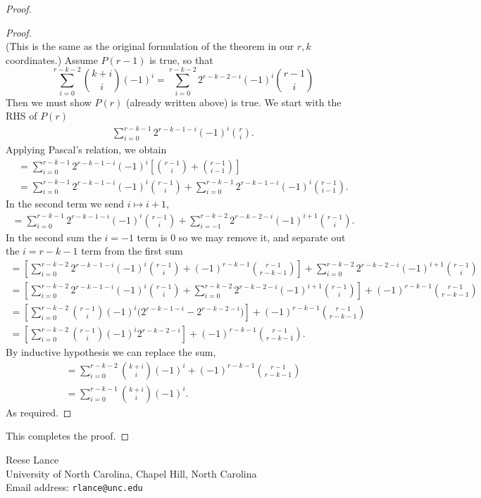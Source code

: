 \documentclass[11pt]{article}
\theoremstyle{plain}
\theoremstyle{definition}
\theoremstyle{definition}
\begin{document}
\begin{proof}
\begin{proof}
$$$$
(This is the same as the original formulation of the theorem in our $r,k$ coordinates.) Assume $P(r-1)$ is true, so that 
$$
\sum_{i=0}^{r-k-2}{k+i\choose i}(-1)^i = \sum_{i=0}^{r-k-2}2^{r-k-2-i}(-1)^i{r-1\choose i}
$$
Then we must show $P(r)$ (already written above) is true. We start with the RHS of $P(r)$
\begin{gather*}
\sum_{i=0}^{r-k-1}2^{r-k-1-i}(-1)^i{r\choose i}.
\end{gather*}
Applying Pascal's relation, we obtain
\begin{gather*}
=\sum_{i=0}^{r-k-1}2^{r-k-1-i}(-1)^i\left[  {r-1\choose i} + {r-1\choose i-1}\right]\\
=\sum_{i=0}^{r-k-1}2^{r-k-1-i}(-1)^i{r-1\choose i} + \sum_{i=0}^{r-k-1}2^{r-k-1-i}(-1)^i{r-1\choose i-1}.
\end{gather*}
In the second term we send $i\mapsto i+1$,
\begin{gather*}
=\sum_{i=0}^{r-k-1}2^{r-k-1-i}(-1)^i{r-1\choose i} + \sum_{i=-1}^{r-k-2}2^{r-k-2-i}(-1)^{i+1}{r-1\choose i}.
\end{gather*}
In the second sum the $i=-1$ term is 0 so we may remove it, and separate out the $i=r-k-1$ term from the first sum 
\begin{gather*}
=\left[\sum_{i=0}^{r-k-2}2^{r-k-1-i}(-1)^i{r-1\choose i}+(-1)^{r-k-1}{r-1\choose r-k-1}\right] + \sum_{i=0}^{r-k-2}2^{r-k-2-i}(-1)^{i+1}{r-1\choose i}\\
=\left[\sum_{i=0}^{r-k-2}2^{r-k-1-i}(-1)^i{r-1\choose i}+ \sum_{i=0}^{r-k-2}2^{r-k-2-i}(-1)^{i+1}{r-1\choose i}\right] + (-1)^{r-k-1}{r-1\choose r-k-1}\\
=\left[\sum_{i=0}^{r-k-2}{r-1\choose i}(-1)^i\big(2^{r-k-1-i}-2^{r-k-2-i}\big)\right] + (-1)^{r-k-1}{r-1\choose r-k-1}\\
=\left[\sum_{i=0}^{r-k-2}{r-1\choose i}(-1)^i2^{r-k-2-i}\right]+(-1)^{r-k-1}{r-1\choose r-k-1}.
\end{gather*}
By inductive hypothesis we can replace the sum,
\begin{gather*}
=\sum_{i=0}^{r-k-2}{k+i\choose i}(-1)^i + (-1)^{r-k-1}{r-1\choose r-k-1}\\
=\sum_{i=0}^{r-k-1}{k+i\choose i}(-1)^i.
\end{gather*}
As required. 
\end{proof}
This completes the proof. 
\end{proof}

\printbibliography
\noindent
Reese Lance\\
University of North Carolina, Chapel Hill, North Carolina\\
Email address: \texttt{rlance@unc.edu} \\
\end{document}
